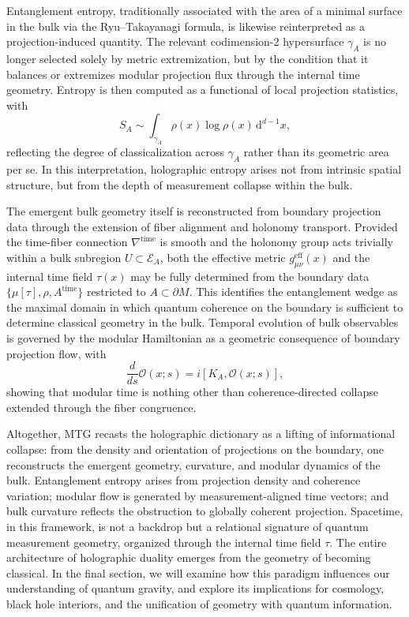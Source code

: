 \documentclass[11pt]{article}
\begin{document}
Entanglement entropy, traditionally associated with the area of a minimal surface in the bulk via the Ryu--Takayanagi formula, is likewise reinterpreted as a projection-induced quantity. The relevant codimension-2 hypersurface \( \gamma_A \) is no longer selected solely by metric extremization, but by the condition that it balances or extremizes modular projection flux through the internal time geometry. Entropy is then computed as a functional of local projection statistics, with
\[
S_A \sim \int_{\gamma_A} \rho(x) \log \rho(x) \, \mathrm{d}^{d-1} x,
\]
reflecting the degree of classicalization across \( \gamma_A \) rather than its geometric area per se. In this interpretation, holographic entropy arises not from intrinsic spatial structure, but from the depth of measurement collapse within the bulk.

The emergent bulk geometry itself is reconstructed from boundary projection data through the extension of fiber alignment and holonomy transport. Provided the time-fiber connection \( \nabla^{\mathrm{time}} \) is smooth and the holonomy group acts trivially within a bulk subregion \( U \subset \mathcal{E}_A \), both the effective metric \( g^{\mathrm{eff}}_{\mu\nu}(x) \) and the internal time field \( \tau(x) \) may be fully determined from the boundary data \( \{ \mu[\tau], \rho, A^{\mathrm{time}} \} \) restricted to \( A \subset \partial M \). This identifies the entanglement wedge as the maximal domain in which quantum coherence on the boundary is sufficient to determine classical geometry in the bulk. Temporal evolution of bulk observables is governed by the modular Hamiltonian as a geometric consequence of boundary projection flow, with
\[
\frac{d}{ds} \mathcal{O}(x; s) = i [K_A, \mathcal{O}(x; s)],
\]
showing that modular time is nothing other than coherence-directed collapse extended through the fiber congruence.

Altogether, MTG recasts the holographic dictionary as a lifting of informational collapse: from the density and orientation of projections on the boundary, one reconstructs the emergent geometry, curvature, and modular dynamics of the bulk. Entanglement entropy arises from projection density and coherence variation; modular flow is generated by measurement-aligned time vectors; and bulk curvature reflects the obstruction to globally coherent projection. Spacetime, in this framework, is not a backdrop but a relational signature of quantum measurement geometry, organized through the internal time field \( \tau \). The entire architecture of holographic duality emerges from the geometry of becoming classical. In the final section, we will examine how this paradigm influences our understanding of quantum gravity, and explore its implications for cosmology, black hole interiors, and the unification of geometry with quantum information.
\end{document}
